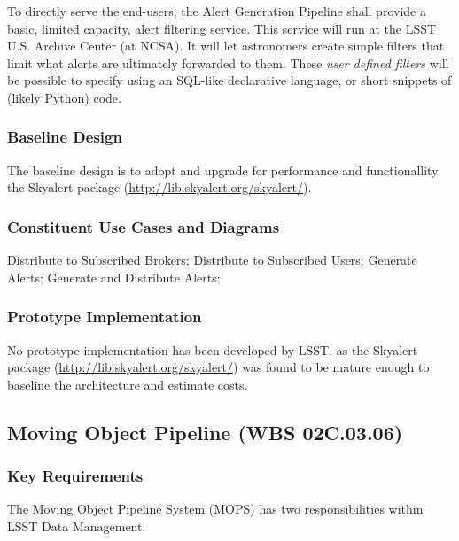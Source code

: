\documentclass[12pt]{article}
\newcommand{\wbsMOPS}{WBS 02C.03.06}
\begin{document}
To directly serve the end-users, the Alert Generation Pipeline shall provide a basic, limited capacity, alert filtering service. This service will run at the LSST U.S. Archive Center (at NCSA). It will let astronomers create simple filters that limit what alerts are ultimately forwarded to them. These \emph{user defined filters} will be possible to specify using an SQL-like declarative language, or short snippets of (likely Python) code.

\subsubsection{Baseline Design}

The baseline design is to adopt and upgrade for performance and functionallity the Skyalert package (\url{http://lib.skyalert.org/skyalert/}).

\subsubsection{Constituent Use Cases and Diagrams}

Distribute to Subscribed Brokers; Distribute to Subscribed Users; Generate Alerts;
Generate and Distribute Alerts;

\subsubsection{Prototype Implementation}

No prototype implementation has been developed by LSST, as the Skyalert package (\url{http://lib.skyalert.org/skyalert/}) was found to be mature enough to baseline the architecture and estimate costs.

\clearpage

\subsection{Moving Object Pipeline (\wbsMOPS)}

\subsubsection{Key Requirements}

The Moving Object Pipeline System (MOPS) has two responsibilities within LSST Data Management:
\end{document}
